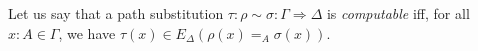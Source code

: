 Let us say that a path substitution $\tau : \rho \sim \sigma : \Gamma \Rightarrow \Delta$ is
\emph{computable} iff, for all $x : A \in \Gamma$, we have $\tau(x) \in E_\Delta(\rho(x) =_A \sigma(x))$.

\begin{code}%
\> \AgdaSymbol{:}  \AgdaSymbol{\{}\AgdaSymbol{\}} \AgdaSymbol{\{}\AgdaSymbol{\}}                    \<%
\\
\>         \AgdaSymbol{=}      \AgdaSymbol{(} \AgdaSymbol{\_}        \AgdaSymbol{\_} \AgdaSymbol{)} \AgdaSymbol{(} \AgdaSymbol{)}\<%
\end{code}

